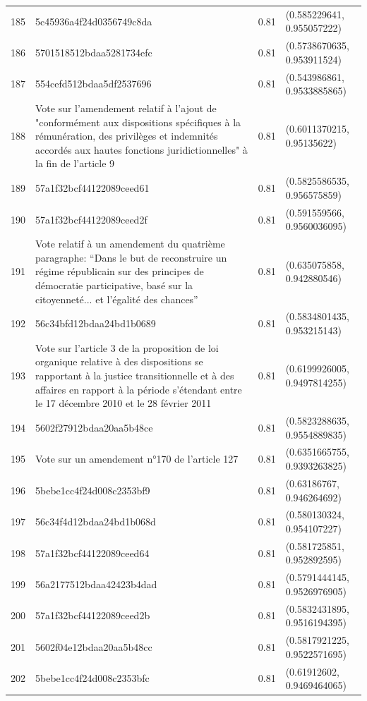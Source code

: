 \begin{table}[ht]
\begin{tabular}{rlrl}
  185 & 5c45936a4f24d0356749c8da & 0.81 & (0.585229641, 0.955057222) \\ 
  186 & 5701518512bdaa5281734efc & 0.81 & (0.5738670635, 0.953911524) \\ 
  187 & 554cefd512bdaa5df2537696 & 0.81 & (0.543986861, 0.9533885865) \\ 
  188 & Vote sur l'amendement relatif à l'ajout de "conformément aux dispositions spécifiques à la rémunération, des privilèges et indemnités accordés aux hautes fonctions juridictionnelles" à la fin de l'article 9 & 0.81 & (0.6011370215, 0.95135622) \\ 
  189 & 57a1f32bcf44122089ceed61 & 0.81 & (0.5825586535, 0.956575859) \\ 
  190 & 57a1f32bcf44122089ceed2f & 0.81 & (0.591559566, 0.9560036095) \\ 
  191 & Vote relatif à un amendement du quatrième paragraphe: “Dans le but de reconstruire un régime républicain sur des principes de démocratie participative, basé sur la citoyenneté... et l’égalité des chances” & 0.81 & (0.635075858, 0.942880546) \\ 
  192 & 56c34bfd12bdaa24bd1b0689 & 0.81 & (0.5834801435, 0.953215143) \\ 
  193 & Vote sur l'article 3 de la proposition de loi organique relative à des dispositions se rapportant à la justice transitionnelle et à des affaires en rapport à la période s'étendant entre le 17 décembre 2010 et le 28 février 2011 & 0.81 & (0.6199926005, 0.9497814255) \\ 
  194 & 5602f27912bdaa20aa5b48ce & 0.81 & (0.5823288635, 0.9554889835) \\ 
  195 & Vote sur un amendement n°170 de l'article 127 & 0.81 & (0.6351665755, 0.9393263825) \\ 
  196 & 5bebe1cc4f24d008c2353bf9 & 0.81 & (0.63186767, 0.946264692) \\ 
  197 & 56c34f4d12bdaa24bd1b068d & 0.81 & (0.580130324, 0.954107227) \\ 
  198 & 57a1f32bcf44122089ceed64 & 0.81 & (0.581725851, 0.952892595) \\ 
  199 & 56a2177512bdaa42423b4dad & 0.81 & (0.5791444145, 0.9526976905) \\ 
  200 & 57a1f32bcf44122089ceed2b & 0.81 & (0.5832431895, 0.9516194395) \\ 
  201 & 5602f04e12bdaa20aa5b48cc & 0.81 & (0.5817921225, 0.9522571695) \\ 
  202 & 5bebe1cc4f24d008c2353bfc & 0.81 & (0.61912602, 0.9469464065) \\ 

\end{tabular}
\end{table}
